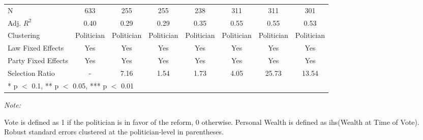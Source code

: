 \begin{table}[!h]
{\begin{threeparttable}
\begin{tabular}[t]{lccccccc}
\midrule
N & \num{633} & \num{255} & \num{255} & \num{238} & \num{311} & \num{311} & \num{301}\\
Adj. $R^2$ & \num{0.40} & \num{0.29} & \num{0.29} & \num{0.35} & \num{0.55} & \num{0.55} & \num{0.53}\\
Clustering & Politician & Politician & Politician & Politician & Politician & Politician & Politician\\
Law Fixed Effects & Yes & Yes & Yes & Yes & Yes & Yes & Yes\\
Party Fixed Effects & Yes & Yes & Yes & Yes & Yes & Yes & Yes\\
Selection Ratio & - & 7.16 & 1.54 & 1.73 & 4.05 & 25.73 & 13.54\\
\bottomrule
\multicolumn{8}{l}{\rule{0pt}{1em}* p $<$ 0.1, ** p $<$ 0.05, *** p $<$ 0.01}\\
\end{tabular}
\begin{tablenotes}[para]
\item \textit{Note: } 
\item Vote is defined as 1 if the politician is in favor of the reform, 0 otherwise. Personal Wealth is defined as ihs(Wealth at Time of Vote). Robust standard errors clustered at the politician-level in parentheses.
\end{tablenotes}
\end{threeparttable}}
\end{table}

